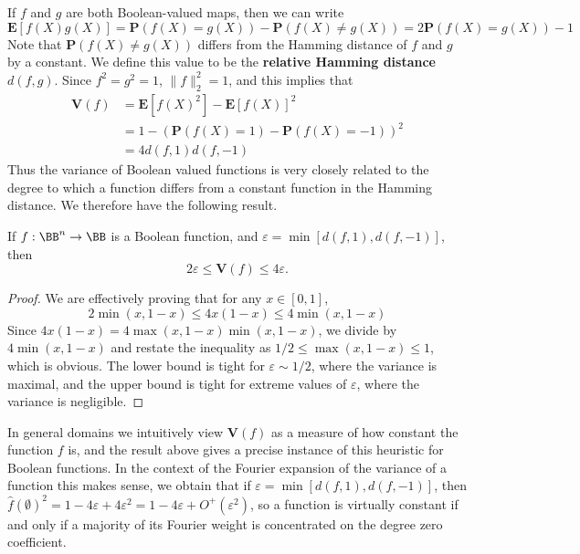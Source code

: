 If $f$ and $g$ are both Boolean-valued maps, then we can write
%
\[ \mathbf{E}[f(X)g(X)] = \mathbf{P}(f(X) = g(X)) - \mathbf{P}(f(X) \neq g(X)) = 2\mathbf{P}(f(X) = g(X)) - 1 \]
%
Note that $\mathbf{P}(f(X) \neq g(X))$ differs from the Hamming distance of $f$ and $g$ by a constant. We define this value to be the {\bf relative Hamming distance} $d(f,g)$. Since $f^2 = g^2 = 1$, $\| f \|_2^2 = 1$, and this implies that
%
\begin{align*}
    \mathbf{V}(f) &= \mathbf{E}[f(X)^2] - \mathbf{E}[f(X)]^2\\
    &= 1 - (\mathbf{P}(f(X) = 1) - \mathbf{P}(f(X) = -1))^2\\
    &= 4d(f,1)d(f,-1)
\end{align*}
%
Thus the variance of Boolean valued functions is very closely related to the degree to which a function differs from a constant function in the Hamming distance. We therefore have the following result.

\begin{lemma}
    If $f: \BB^n \to \BB$ is a Boolean function, and $\varepsilon = \min[d(f,1),d(f,-1)]$, then
    \[ 2\varepsilon \leq \mathbf{V}(f) \leq 4\varepsilon. \]
\end{lemma}
\begin{proof}
    We are effectively proving that for any $x \in [0,1]$,
    \[ 2\min(x,1-x) \leq 4x(1-x) \leq 4\min(x,1-x) \]
    Since $4x(1-x) = 4\max(x,1-x)\min(x,1-x)$, we divide by $4\min(x,1-x)$ and restate the inequality as $1/2 \leq \max(x,1-x) \leq 1$, which is obvious. The lower bound is tight for $\varepsilon \sim 1/2$, where the variance is maximal, and the upper bound is tight for extreme values of $\varepsilon$, where the variance is negligible.
\end{proof}

In general domains we intuitively view $\mathbf{V}(f)$ as a measure of how constant the function $f$ is, and the result above gives a precise instance of this heuristic for Boolean functions. In the context of the Fourier expansion of the variance of a function this makes sense, we obtain that if $\varepsilon = \min[d(f,1),d(f,-1)]$, then $\widehat{f}(\emptyset)^2 = 1 - 4\varepsilon + 4\varepsilon^2 = 1 - 4\varepsilon + O^+(\varepsilon^2)$, so a function is virtually constant if and only if a majority of its Fourier weight is concentrated on the degree zero coefficient.

